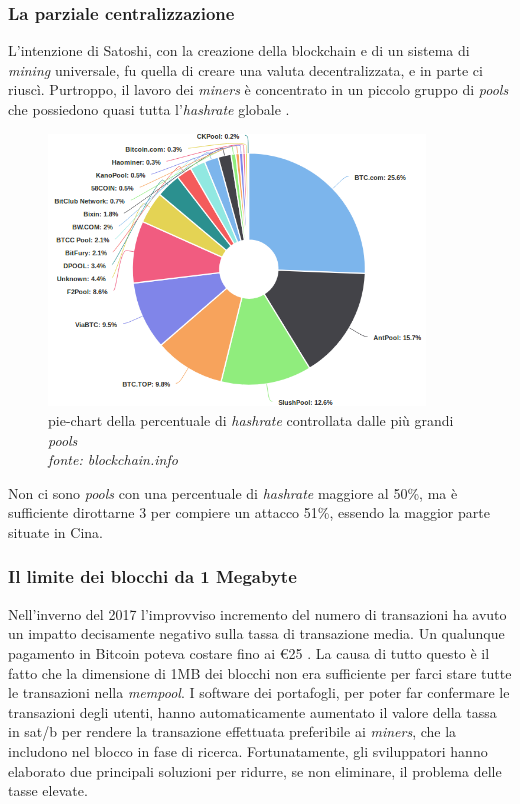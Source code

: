 \documentclass {article}
\begin{document}
\subsubsection {La parziale centralizzazione}


L'intenzione di Satoshi, con la creazione della blockchain e di un sistema di \textit{mining} universale, fu quella di creare una valuta decentralizzata, e in parte ci riuscì.
Purtroppo, il lavoro dei \textit{miners} è concentrato in un piccolo gruppo di \textit{pools} che possiedono quasi tutta l'\textit{hashrate} globale \cite{centralization}.

\vspace {0.5cm}
\begin{figure}[htb!]
\includegraphics [width = 10cm] {pools.png}
\centering
\captionsetup{width=1.4\linewidth}
\caption {pie-chart della percentuale di \textit{hashrate} controllata dalle più grandi \textit{pools}\\\textit{fonte: blockchain.info}}
\end{figure}
\vspace {0.2cm}
\noindent
%
Non ci sono \textit{pools} con una percentuale di \textit{hashrate} maggiore al 50\%, ma è sufficiente dirottarne 3 per compiere un attacco 51\%, essendo la maggior parte situate in Cina.


\subsubsection {Il limite dei blocchi da 1 Megabyte}


Nell'inverno del 2017 l'improvviso incremento del numero di transazioni ha avuto un impatto decisamente negativo sulla tassa di transazione media.
Un qualunque pagamento in Bitcoin poteva costare fino ai \euro{25} \cite{highfees}.
La causa di tutto questo è il fatto che la dimensione di 1MB dei blocchi non era sufficiente per farci stare tutte le transazioni nella \textit{mempool}.
I software dei portafogli, per poter far confermare le transazioni degli utenti, hanno automaticamente aumentato il valore della tassa in sat/b per rendere la transazione effettuata preferibile ai \textit{miners}, che la includono nel blocco in fase di ricerca.
Fortunatamente, gli sviluppatori hanno elaborato due principali soluzioni per ridurre, se non eliminare, il problema delle tasse elevate.
\end{document}
